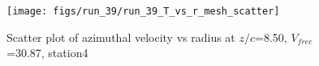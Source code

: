 \begin{figure}[H]
\centering
\texttt{[image: figs/run\_39/run\_39\_T\_vs\_r\_mesh\_scatter]}
\caption{Scatter plot of azimuthal velocity vs radius at $z/c$=8.50, $V_{free}$=30.87, station4}
\label{fig:run_39_T_vs_r_mesh_scatter}
\end{figure}


